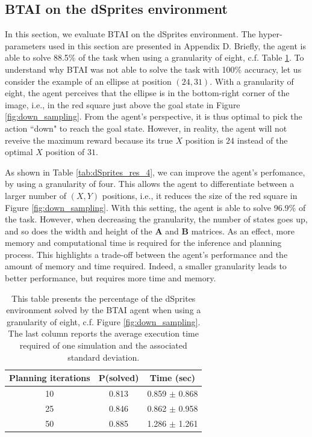 \documentclass[twoside,11pt]{article}
\begin{document}
\subsection{BTAI on the dSprites environment} \label{ssec:BTAI_dSprites}

In this section, we evaluate BTAI on the dSprites environment. The hyper-parameters used in this section are presented in Appendix D. Briefly, the agent is able to solve 88.5\% of the task when using a granularity of eight, c.f. Table \ref{tab:dSprites_res_8}. To understand why BTAI was not able to solve the task with 100\% accuracy, let us consider the example of an ellipse at position $(24,31)$. With a granularity of eight, the agent perceives that the ellipse is in the bottom-right corner of the image, i.e., in the red square just above the goal state in Figure \ref{fig:down_sampling}. From the agent's perspective, it is thus optimal to pick the action ``down" to reach the goal state. However, in reality, the agent will not reveive the maximum reward because its true $X$ position is $24$ instead of the optimal $X$ position of $31$. 

As shown in Table \ref{tab:dSprites_res_4}, we can improve the agent's perfomance, by using a granularity of four. This allows the agent to differentiate between a larger number of $(X,Y)$ positions, i.e., it reduces the size of the red square in Figure \ref{fig:down_sampling}. With this setting, the agent is able to solve 96.9\% of the task. However, when decreasing the granularity, the number of states goes up, and so does the width and height of the $\bm{A}$ and $\bm{B}$ matrices. As an effect, more memory and computational time is required for the inference and planning process. This highlights a trade-off between the agent's performance and the amount of memory and time required. Indeed, a smaller granularity leads to better performance, but requires more time and memory.

\begin{table}[H]
\centering
\begin{tabular}{ |c|c|c| }
 \hline
 Planning iterations & P(solved) & Time (sec) \\
 \hline
 10 & 0.813	 & 0.859 $\pm$ 0.868 \\
 \hline
 25 & 0.846 & 0.862 $\pm$ 0.958 \\
 \hline
 50 & 0.885 & 1.286 $\pm$ 1.261 \\
 \hline
\end{tabular}
\caption{This table presents the percentage of the dSprites environment solved by the BTAI agent when using a granularity of eight, c.f. Figure \ref{fig:down_sampling}. The last column reports the average execution time required of one simulation and the associated standard deviation.}
\label{tab:dSprites_res_8}
\end{table}
\end{document}

